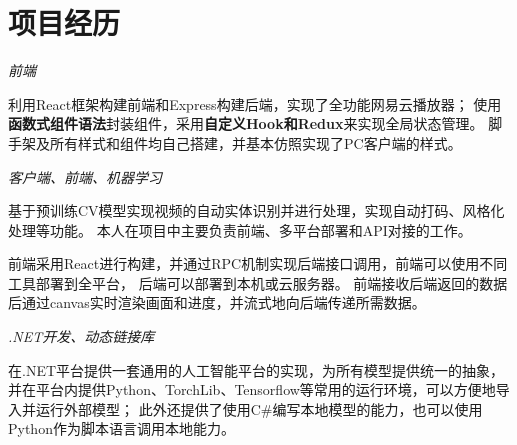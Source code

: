 \documentclass{uniquecv}
\begin{document}
\section{项目经历}

\textit{前端}
\vspace{0.4ex}
 
利用React框架构建前端和Express构建后端，实现了全功能网易云播放器；
使用\textbf{函数式组件语法}封装组件，采用\textbf{自定义Hook和Redux}来实现全局状态管理。
脚手架及所有样式和组件均自己搭建，并基本仿照实现了PC客户端的样式。

\textit{客户端、前端、机器学习}
\vspace{0.4ex}

基于预训练CV模型实现视频的自动实体识别并进行处理，实现自动打码、风格化处理等功能。
本人在项目中主要负责前端、多平台部署和API对接的工作。
\par 前端采用React进行构建，并通过RPC机制实现后端接口调用，前端可以使用不同工具部署到全平台，
后端可以部署到本机或云服务器。
前端接收后端返回的数据后通过canvas实时渲染画面和进度，并流式地向后端传递所需数据。



\textit{.NET开发、动态链接库}
\vspace{0.4ex}

在.NET平台提供一套通用的人工智能平台的实现，为所有模型提供统一的抽象，
并在平台内提供Python、TorchLib、Tensorflow等常用的运行环境，可以方便地导入并运行外部模型；
此外还提供了使用C\#编写本地模型的能力，也可以使用Python作为脚本语言调用本地能力。





\end{document}
